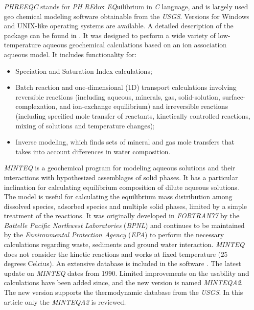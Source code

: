\documentclass[preprint,12pt,3p]{elsarticle}
\begin{document}
\emph{PHREEQC} stands for \emph{PH} \emph{RE}dox \emph{EQ}uilibrium in \emph{C} language, and is largely used geo chemical modeling software obtainable from the \emph{USGS}. Versions for Windows and UNIX-like operating systems are available. A detailed description of the package can be found in \cite{Parkhurst:95}. It was designed to perform a wide variety of low-temperature aqueous geochemical calculations based on an ion association aqueous model. It includes functionality for:
\begin{itemize}
\item Speciation and Saturation Index calculations;
\item Batch reaction and one-dimensional (1D) transport calculations involving reversible reactions (including aqueous, minerals, gas, solid-solution, surface-complexation, and ion-exchange equilibrium) and irreversible reactions (including specified mole transfer of reactants, kinetically controlled reactions, mixing of solutions and temperature changes);
\item Inverse modeling, which finds sets of mineral and gas mole transfers that takes into account differences in water composition.
\end{itemize}

\emph{MINTEQ} \cite{Felmy:84}  is a geochemical program for modeling aqueous solutions and their interactions with hypothesized assemblages of solid phases. It has a particular inclination for calculating equilibrium composition of dilute aqueous solutions. The model is useful for calculating the equilibrium mass distribution among dissolved species, adsorbed species and multiple solid phases, limited by a simple treatment of the reactions. It was originally developed in \emph{FORTRAN77} by the \emph{Battelle Pacific Northwest Laboratories} (\emph{BPNL}) and continues to be maintained by the \emph{Environmental Protection Agency} (\emph{EPA}) to perform the necessary calculations regarding waste, sediments and ground water interaction. \emph{MINTEQ} does not consider the kinetic reactions and works at fixed temperature ($25$ degrees Celcius). An extensive database is included in the software \cite{Brown:87} \cite{Allison:91}. 
The latest update on \emph{MINTEQ} dates from 1990. Limited improvements on the usability and calculations have been added since, and the new version is named \emph{MINTEQA2}. The new version supports the thermodynamic database from the \emph{USGS}. In this article only the \emph{MINTEQA2} is reviewed.
\end{document}
